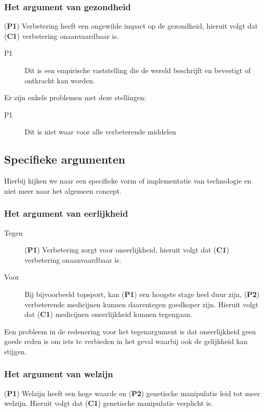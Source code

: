 \documentclass[../summary.tex]{subfiles}
\begin{document}
			\subsubsection{Het argument van gezondheid}
				(\textbf{P1}) Verbetering heeft een ongewilde impact op de gezondheid, hieruit volgt dat (\textbf{C1}) verbetering onaanvaardbaar is. 
				\begin{description}
					\item[P1] Dit is een empirische vaststelling die de wereld beschrijft en bevestigt of ontkracht kan worden. 
				\end{description}
				Er zijn enkele problemen met deze stellingen:
				\begin{description}
					\item[P1] Dit is niet waar voor alle verbeterende middelen
				\end{description} 
		\newpage
		\subsection{Specifieke argumenten}
			Hierbij kijken we naar een specifieke vorm of implementatie van technologie en niet meer naar het algemeen concept.
			\subsubsection{Het argument van eerlijkheid}
				\begin{description}
					\item[Tegen] (\textbf{P1}) Verbetering zorgt voor oneerlijkheid, hieruit volgt dat (\textbf{C1}) verbetering onaanvaardbaar is. 
					\item[Voor] Bij bijvoorbeeld topsport, kan (\textbf{P1}) een hoogste stage heel duur zijn, (\textbf{P2}) verbeterende medicijnen kunnen daarentegen goedkoper zijn. Hieruit volgt dat (\textbf{C1}) medicijnen oneerlijkheid kunnen tegengaan. 
				\end{description}
				Een probleem in de redenering voor het  tegenargument is dat oneerlijkheid geen goede reden is om iets te verbieden in het geval waarbij ook de gelijkheid kan stijgen.
			\subsubsection{Het argument van welzijn}
				(\textbf{P1}) Welzijn heeft een hoge waarde en (\textbf{P2}) genetische manipulatie leid tot meer welzijn. Hieruit volgt dat (\textbf{C1}) genetische manipulatie verplicht is. 
				
\end{document}
